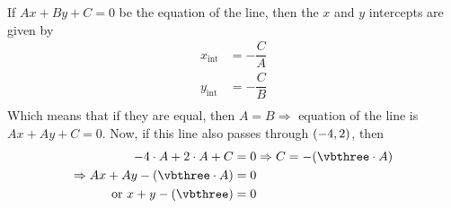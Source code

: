 \begin{solution}[\halfpage]
   If $Ax + By + C = 0$ be the equation of the line, then the $x$ and $y$ intercepts are given by
   \begin{align}
   	  x_{\text{int}} &= -\dfrac{C}{A} \\ 
   	  y_{\text{int}} &= -\dfrac{C}{B} \\
   \end{align}
   Which means that if they are equal, then $A = B \Rightarrow$ equation of the line is $Ax + Ay + C = 0$. 
   Now, if this line also passes through $(-4, 2)$, then 
   \begin{align}
      \vbone\cdot A + \vbtwo\cdot A + C &= 0 \Rightarrow C = -(\vbthree\cdot A) \\
      \Rightarrow Ax + Ay - (\vbthree\cdot A) &= 0 \\
      \text{ or } x + y - (\vbthree) &= 0
   \end{align}
   
\end{solution}
